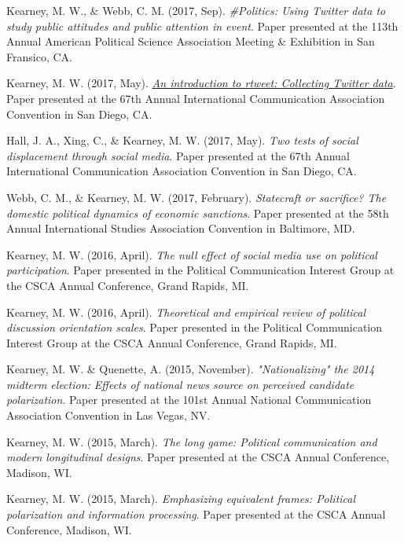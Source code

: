 \begin{bibenum}
    \item[] Kearney, M. W., \& Webb, C. M. (2017, Sep).
      \textit{\#Politics: Using Twitter data to study public attitudes and public attention in event}.
      Paper presented at the 113th Annual American Political Science Association Meeting \& Exhibition in San Fransico, CA.
    \item[] Kearney, M. W. (2017, May).
      \href{https://mkearney.github.io/ica17/}{\textit{An introduction to rtweet: Collecting Twitter data}}.
      Paper presented at the 67th Annual International Communication Association Convention in San Diego, CA.
    \item[] Hall, J. A., Xing, C., \& Kearney, M. W. (2017, May).
      \textit{Two tests of social displacement through social media}.
      Paper presented at the 67th Annual International Communication Association Convention in San Diego, CA.
    \item[] Webb, C. M., \& Kearney, M. W. (2017, February).
      \textit{Statecraft or sacrifice? The domestic political dynamics of economic sanctions}.
      Paper presented at the 58th Annual International Studies Association Convention in Baltimore, MD.
    \item[] Kearney, M. W. (2016, April).
      \textit{The null effect of social media use on political participation}.
      Paper presented in the Political Communication Interest Group at the CSCA Annual Conference, Grand Rapids, MI.
    \item[] Kearney, M. W. (2016, April).
      \textit{Theoretical and empirical review of political discussion orientation scales}.
      Paper presented in the Political Communication Interest Group at the CSCA Annual Conference, Grand Rapids, MI.
    \item[] Kearney, M. W. \& Quenette, A. (2015, November).
      \textit{"Nationalizing" the 2014 midterm election: Effects of national news source on perceived candidate polarization}.
      Paper presented at the 101st Annual National Communication Association Convention in Las Vegas, NV.
    \item[] Kearney, M. W. (2015, March).
      \textit{The long game: Political communication and modern longitudinal designs}.
      Paper presented at the CSCA Annual Conference, Madison, WI.
    \item[] Kearney, M. W. (2015, March).
      \textit{Emphasizing equivalent frames: Political polarization and information processing}.
      Paper presented at the CSCA Annual Conference, Madison, WI.\\

\end{bibenum}
